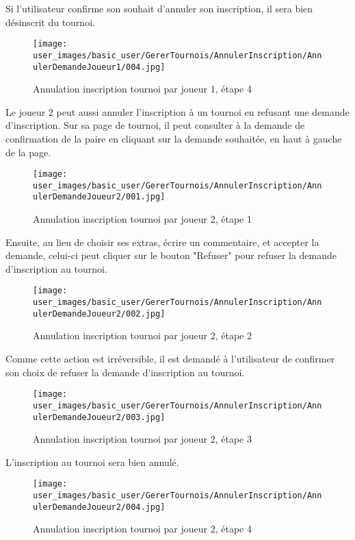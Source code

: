 Si l'utilisateur confirme son souhait d'annuler son inscription, il sera bien désinscrit du tournoi.

\begin{figure}[H]
\centering
\texttt{[image: user\_images/basic\_user/GererTournois/AnnulerInscription/AnnulerDemandeJoueur1/004.jpg]}
\caption{Annulation inscription tournoi par joueur 1, étape 4}
\end{figure}

Le joueur 2 peut aussi annuler l'inscription à un tournoi en refusant une demande d'inscription. Sur sa page de tournoi, il peut consulter à la demande de confirmation de la paire en cliquant sur la demande souhaitée, en haut à gauche de la page.

\begin{figure}[H]
\centering
\texttt{[image: user\_images/basic\_user/GererTournois/AnnulerInscription/AnnulerDemandeJoueur2/001.jpg]}
\caption{Annulation inscription tournoi par joueur 2, étape 1}
\end{figure}

Ensuite, au lieu de choisir ses extras, écrire un commentaire, et accepter la demande, celui-ci peut cliquer sur le bouton "Refuser" pour refuser la demande d'inscription au tournoi.

\begin{figure}[H]
\centering
\texttt{[image: user\_images/basic\_user/GererTournois/AnnulerInscription/AnnulerDemandeJoueur2/002.jpg]}
\caption{Annulation inscription tournoi par joueur 2, étape 2}
\end{figure}

Comme cette action est irréversible, il est demandé à l'utilisateur de confirmer son choix de refuser la demande d'inscription au tournoi.

\begin{figure}[H]
\centering
\texttt{[image: user\_images/basic\_user/GererTournois/AnnulerInscription/AnnulerDemandeJoueur2/003.jpg]}
\caption{Annulation inscription tournoi par joueur 2, étape 3}
\end{figure}

L'inscription au tournoi sera bien annulé.

\begin{figure}[H]
\centering
\texttt{[image: user\_images/basic\_user/GererTournois/AnnulerInscription/AnnulerDemandeJoueur2/004.jpg]}
\caption{Annulation inscription tournoi par joueur 2, étape 4}
\end{figure}

